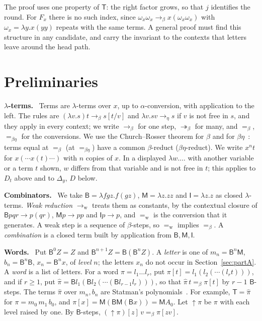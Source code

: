 \documentclass[a4paper,english]{lipics-v2021}
\newcommand{\B}{\mathsf{B}}
\newcommand{\M}{\mathsf{M}}
\newcommand{\I}{\mathsf{I}}
\newcommand{\T}{\mathsf{T}}
\newcommand{\wred}{\to_{\mathrm{w}}}
\newcommand{\bred}{\to_{\beta}}
\newcommand{\breds}{\twoheadrightarrow_{\beta}}
\newcommand{\eqw}{=_{\mathrm{w}}}
\newcommand{\eqb}{=_{\beta}}
\newcommand{\eqbe}{=_{\beta\eta}}
\newcommand{\Dd}[1]{D_{#1}}
\newcommand{\Del}[1]{\Delta_{#1}}
\newcommand{\hatw}[1]{\widehat{#1}}
\newcommand{\up}{{\uparrow}}
\newcommand{\om}{\omega_x}
\newcommand{\runin}[1]{\par\smallskip\noindent\textbf{#1}\ }
\begin{document}
The proof uses one property of $\T$: the right factor grows, so that $j$ identifies the round. For $F_x$ there is no such index, since $\om\om \bred x(\om\om)$ with $\om = \lambda y.x(yy)$ repeats with the same terms. A general proof must find this structure in any candidate, and carry the invariant to the contexts that letters leave around the head path.

\section{Preliminaries}\label{sec:prelim}

\runin{$\lambda$-terms.} Terms are $\lambda$-terms over $x$, up to $\alpha$-conversion, with application to the left. The rules are $(\lambda v.s)t \to_\beta s[t/v]$ and $\lambda v.sv \to_\eta s$ if $v$ is not free in $s$, and they apply in every context; we write $\bred$ for one step, $\breds$ for many, and $\eqb$, $\eqbe$ for the conversions. We use the Church--Rosser theorem for $\beta$ and for $\beta\eta$~\cite{barendregt}: terms equal at $\eqb$ (at $\eqbe$) have a common $\beta$-reduct ($\beta\eta$-reduct). We write $x^nt$ for $x(\cdots x(t)\cdots)$ with $n$ copies of $x$. In a displayed $\lambda w.\ldots$ with another variable or a term $t$ shown, $w$ differs from that variable and is not free in $t$; this applies to $\Dd{t}$ above and to $\Del{y}$, $D$ below.

\runin{Combinators.} We take $\B = \lambda fgz.f(gz)$, $\M = \lambda z.zz$ and $\I = \lambda z.z$ as closed $\lambda$-terms. \emph{Weak reduction} $\wred$ treats them as constants, by the contextual closure of $\B pqr \to p(qr)$, $\M p \to pp$ and $\I p \to p$, and $\eqw$ is the conversion that it generates. A weak step is a sequence of $\beta$-steps, so $\eqw$ implies $\eqb$. A \emph{combination} is a closed term built by application from $\B,\M,\I$.

\runin{Words.} Put $\B^0Z = Z$ and $\B^{n+1}Z = \B(\B^nZ)$. A \emph{letter} is one of $m_n = \B^n\M$, $b_n = \B^n\B$, $x_n = \B^nx$, of \emph{level} $n$; the letters $x_n$ do not occur in Section~\ref{sec:partA}. A \emph{word} is a list of letters. For a word $\pi = l_1\ldots l_r$, put $\pi[t] = l_1(l_2(\cdots(l_rt)))$, and if $r \geq 1$, put $\hatw{\pi} = \B l_1(\B l_2(\cdots(\B l_{r-1}l_r)))$, so that $\hatw{\pi}\,t \eqb \pi[t]$ by $r-1$ $\B$-steps. The terms $\hatw{\pi}$ over $m_n,b_n$ are Statman's polynomials~\cite{statman2011}. For example, $\T = \hatw{\pi}$ for $\pi = m_0\,m_1\,b_0$, and $\pi[x] = \M(\B\M(\B x)) = \M A_0$. Let $\up \pi$ be $\pi$ with each level raised by one. By $\B$-steps, $(\up \pi)[z]\,v \eqb \pi[zv]$.
\end{document}

